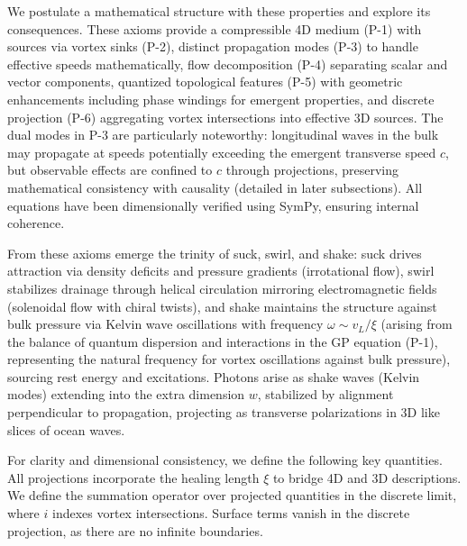 We postulate a mathematical structure with these properties and explore its consequences. These axioms provide a compressible 4D medium (P-1) with sources via vortex sinks (P-2), distinct propagation modes (P-3) to handle effective speeds mathematically, flow decomposition (P-4) separating scalar and vector components, quantized topological features (P-5) with geometric enhancements including phase windings for emergent properties, and discrete projection (P-6) aggregating vortex intersections into effective 3D sources. The dual modes in P-3 are particularly noteworthy: longitudinal waves in the bulk may propagate at speeds potentially exceeding the emergent transverse speed $c$, but observable effects are confined to $c$ through projections, preserving mathematical consistency with causality (detailed in later subsections). All equations have been dimensionally verified using SymPy, ensuring internal coherence.

From these axioms emerge the trinity of suck, swirl, and shake: suck drives attraction via density deficits and pressure gradients (irrotational flow), swirl stabilizes drainage through helical circulation mirroring electromagnetic fields (solenoidal flow with chiral twists), and shake maintains the structure against bulk pressure via Kelvin wave oscillations with frequency $\omega \sim v_L / \xi$ (arising from the balance of quantum dispersion and interactions in the GP equation (P-1), representing the natural frequency for vortex oscillations against bulk pressure), sourcing rest energy and excitations. Photons arise as shake waves (Kelvin modes) extending into the extra dimension $w$, stabilized by alignment perpendicular to propagation, projecting as transverse polarizations in 3D like slices of ocean waves.

For clarity and dimensional consistency, we define the following key quantities. All projections incorporate the healing length $\xi$ to bridge 4D and 3D descriptions. We define the summation operator over projected quantities in the discrete limit, where $i$ indexes vortex intersections. Surface terms vanish in the discrete projection, as there are no infinite boundaries.

